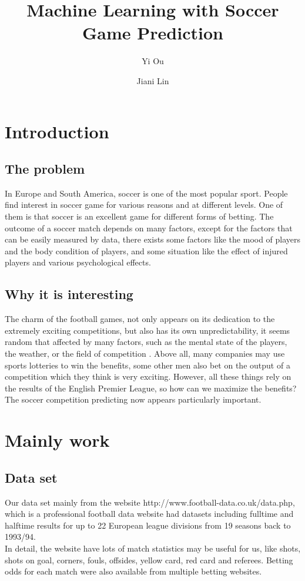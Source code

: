 \documentclass[conference,11pt]{article}
\title{\textbf{Machine Learning with Soccer Game Prediction}}
\author{Yi Ou \and Jiani Lin}
\begin{document}
\maketitle

\section{Introduction}
\subsection{The problem}
In Europe and South America, soccer is one of the most popular sport. People find interest in soccer game for various reasons and at different levels. One of them is that soccer is an excellent game for different forms of betting. The outcome of a soccer match depends on many factors, except for the factors that can be easily measured by data, there exists some factors like the mood of players and the body condition of players, and some situation like the effect of injured players and various psychological effects. 
\subsection{Why it is interesting}
The charm of the football games, not only appears on its dedication to the extremely exciting competitions, but also has its own unpredictability, it seems random that affected by many factors, such as the mental state of the players, the weather, or the field of competition . Above all, many companies may use sports lotteries to win the benefits, some other men also bet on the output of a competition which they think is very exciting. However, all these things rely on the results of the English Premier League, so how can we maximize the benefits? The soccer competition predicting now appears particularly important. 

\section{Mainly work}
\subsection{Data set}
Our data set mainly from the website http://www.football-data.co.uk/data.php, which is a professional football data website had datasets including fulltime and halftime results for up to 22 European league divisions from 19
seasons back to 1993/94.\\ 
In detail, the website have lots of match statistics may be useful for us,  like shots, shots
on goal, corners, fouls, offsides, yellow card, red card and referees. Betting odds for each match were also
available from multiple betting websites.
\end{document}
